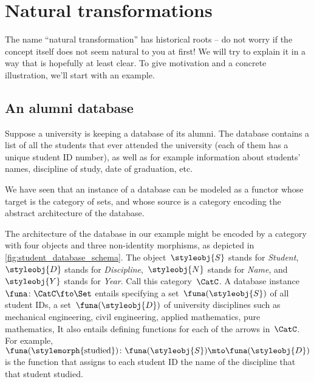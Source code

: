 
\section{Natural transformations}


The name ``natural transformation'' has historical roots -- do not worry if the concept itself does not seem natural to you at first!
We will try to explain it in a way that is hopefully at least clear.
To give motivation and a concrete illustration, we'll start with an example.

\subsection{An alumni database}

Suppose a university is keeping a database of its alumni.
The database contains a list of all the students that ever attended the university (each of them has a unique student ID number), as well as for example information about students' names, discipline of study, date of graduation, etc.

We have seen that an instance of a database can be modeled as a functor whose target is the category of sets, and whose source is a category encoding the abstract architecture of the database.

%
\begin{marginfigure}
    \centering
    \caption{}
    \label{fig:student_database_schema}
\end{marginfigure}
%

The architecture of the database in our example might be encoded by a category with four objects and three non-identity morphisms, as depicted in \cref{fig:student_database_schema}.
The object~$\styleobj{S}$ stands for \emph{Student},~$\styleobj{D}$ stands for \emph{Discipline},~$\styleobj{N}$ stands for \emph{Name}, and~$\styleobj{Y}$ stands for \emph{Year}.
Call this category~$\CatC$.
A database instance~$\funa \colon \CatC \fto \Set$ entails specifying a set~$\funa(\styleobj{S})$ of all student IDs, a set~$\funa(\styleobj{D})$ of university disciplines such as mechanical engineering, civil engineering, applied mathematics, pure mathematics, \etc
It also entails defining functions for each of the arrows in~$\CatC$.
For example,~$\funa(\stylemorph{\text{studied}}) \colon \funa(\styleobj{S}) \mto \funa(\styleobj{D})$ is the function that assigns to each student ID the name of the discipline that that student studied.

